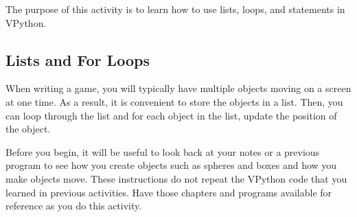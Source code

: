 
\apparatus
{}

\longgoal

The purpose of this activity is to learn how to use lists,  loops, and  statements in VPython.

\introduction

\subsection*{Lists and For Loops}

When writing a game, you will typically have multiple objects moving on a screen at one time. As a result, it is convenient to store the objects in a list. Then, you can loop through the list and for each object in the list, update the position of the object.

\procedure

Before you begin, it will be useful to look back at your notes or a previous program to see how you create objects such as spheres and boxes and how you make objects move. These instructions do not repeat the VPython code that you learned in previous activities. Have those chapters and programs available for reference as you do this activity.


